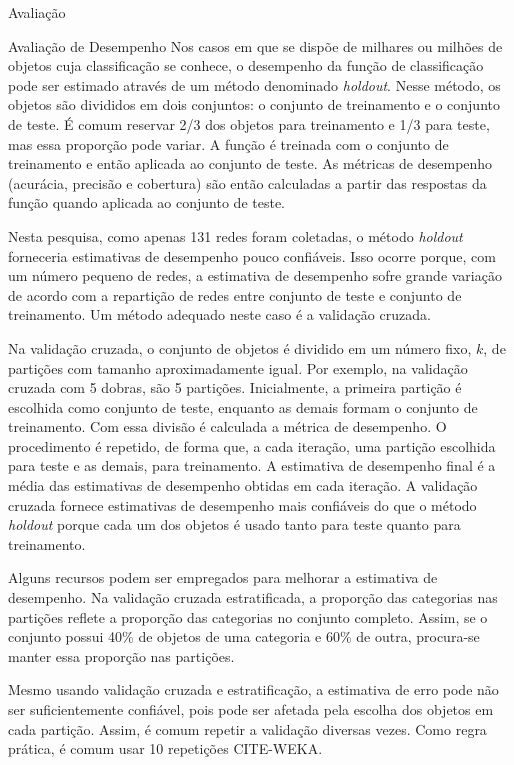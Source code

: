 \begin{section}{Avaliação}
\begin{subsection}{Avaliação de Desempenho}
	Nos casos em que se dispõe de milhares ou milhões de objetos cuja classificação se conhece, o desempenho da função de classificação pode ser estimado através de um método denominado \emph{holdout}. Nesse método, os objetos são divididos em dois conjuntos: o conjunto de treinamento e o conjunto de teste. É comum reservar 2/3 dos objetos para treinamento e 1/3 para teste, mas essa proporção pode variar. A função é treinada com o conjunto de treinamento e então aplicada ao conjunto de teste. As métricas de desempenho (acurácia, precisão e cobertura) são então calculadas a partir das respostas da função quando aplicada ao conjunto de teste.
	
	Nesta pesquisa, como apenas 131 redes foram coletadas, o método \emph{holdout} forneceria estimativas de desempenho pouco confiáveis. Isso ocorre porque, com um número pequeno de redes, a estimativa de desempenho sofre grande variação de acordo com a repartição de redes entre conjunto de teste e conjunto de treinamento. Um método adequado neste caso é a validação cruzada.
	
	Na validação cruzada, o conjunto de objetos é dividido em um número fixo, $k$, de partições com tamanho aproximadamente igual. Por exemplo, na validação cruzada com 5 dobras, são 5 partições. Inicialmente, a primeira partição é escolhida como conjunto de teste, enquanto as demais formam o conjunto de treinamento. Com essa divisão é calculada a métrica de desempenho. O procedimento é repetido, de forma que, a cada iteração, uma partição escolhida para teste e as demais, para treinamento. A estimativa de desempenho final é a média das estimativas de desempenho obtidas em cada iteração. A validação cruzada fornece estimativas de desempenho mais confiáveis do que o método \emph{holdout} porque cada um dos objetos é usado tanto para teste quanto para treinamento.
	
	Alguns recursos podem ser empregados para melhorar a estimativa de desempenho. Na validação cruzada estratificada, a proporção das categorias nas partições reflete a proporção das categorias no conjunto completo. Assim, se o conjunto possui 40\% de objetos de uma categoria e 60\% de outra, procura-se manter essa proporção nas partições. 
	
	Mesmo usando validação cruzada e estratificação, a estimativa de erro pode não ser suficientemente confiável, pois pode ser afetada pela escolha dos objetos em cada partição. Assim, é comum repetir a validação diversas vezes. Como regra prática, é comum usar 10 repetições CITE-WEKA.
	

\end{subsection}
\end{section}

